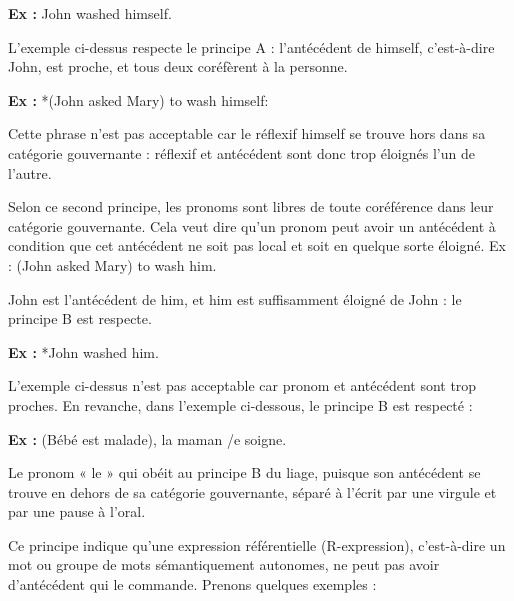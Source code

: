 \noindent\textbf{Ex :} John washed himself.\par


L’exemple ci-dessus respecte le principe A : l’antécédent de himself, c’est-à-dire John, est proche, et tous deux coréfèrent à la personne.\par

\noindent\textbf{Ex :} *(John asked Mary) to wash himself:\par

Cette phrase n’est pas acceptable car le réflexif himself se trouve hors dans sa catégorie gouvernante : réflexif et antécédent sont donc trop éloignés l’un de l’autre.\par


Selon ce second principe, les pronoms sont libres de toute coréférence dans leur catégorie gouvernante. Cela veut dire qu’un pronom peut avoir un antécédent à condition que cet antécédent ne soit pas local et soit en quelque sorte éloigné. Ex : (John asked Mary) to wash him.\par

John est l’antécédent de him, et him est suffisamment éloigné de John : le principe B est respecte.\par

\noindent\textbf{Ex :} *John washed him.\par

L’exemple ci-dessus n’est pas acceptable car pronom et antécédent sont trop proches. En revanche, dans l’exemple ci-dessous, le principe B est respecté :\par

\noindent\textbf{Ex :} (Bébé est malade), la maman /e soigne.\par

Le pronom « le » qui obéit au principe B du liage, puisque son antécédent se trouve en dehors de sa catégorie gouvernante, séparé à l’écrit par une virgule et par une pause à l’oral.\par


Ce principe indique qu’une expression référentielle (R-expression), c’est-à-dire un mot ou groupe de mots sémantiquement autonomes, ne peut pas avoir d’antécédent qui le commande. Prenons quelques exemples :\par

